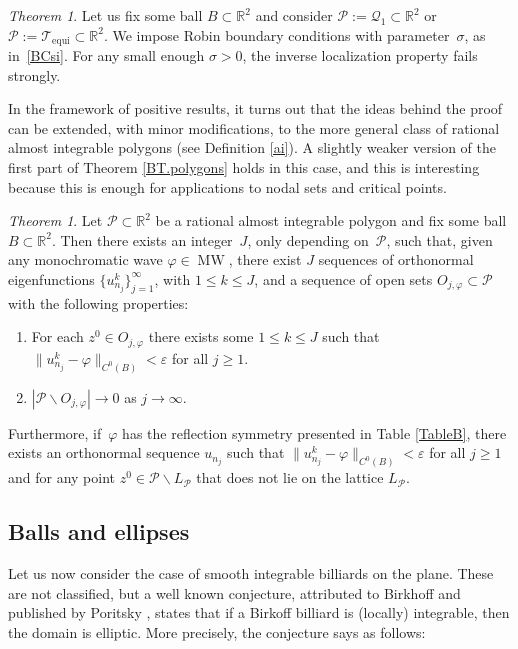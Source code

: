 \documentclass{amsart}
\theoremstyle{definition}
\theoremstyle{remark}
\newcommand{\ep}{\varepsilon}
\newcommand{\si}{\sigma}
\newcommand{\vp}{\varphi}
\def\RR{\mathbb{R}}
\renewcommand\leq\leqslant
\renewcommand\geq\geqslant
\numberwithin{equation}{section}
\newcounter{bigthm}
\newtheorem{bigtheorem}[bigthm]{Theorem} %
\theoremstyle{definition}
\theoremstyle{remark}
\def\RR{\mathbb{R}}
\DeclareMathOperator\MW{MW}
\begin{document}
\begin{bigtheorem}\label{T.noILrobin}
	Let us fix some ball $B\subset\RR^2$ and consider $\mathcal{P}:=\mathcal{Q}_1\subset\RR^2$ or $\mathcal{P}:=\mathcal{T}_{\mathrm{equi}}\subset\RR^2$. We impose  Robin boundary conditions with parameter~$\si$, as in~\eqref{BCsi}. For any small enough $\si>0$, the inverse localization property fails strongly.
\end{bigtheorem}



In the framework of positive results, it turns out that the ideas behind the proof can be extended, with minor modifications, to the more general class of rational almost integrable polygons (see Definition \ref{ai}). A slightly weaker version of the first part of Theorem \ref{BT.polygons} holds in this case, and this is interesting because this is enough for applications to nodal sets and critical points.

\begin{bigtheorem}\label{T.LATICE}
	Let $\mathcal P\subset\mathbb{R}^{2}$ be a rational almost integrable polygon and fix some ball $B\subset\RR^2$. Then there exists an integer~$J$, only depending on~$\mathcal P$, such that, given any monochromatic wave $\vp\in\MW$, there exist $J$ sequences of orthonormal eigenfunctions $\{u_{n_j}^k\}_{j=1}^\infty$, with $1\leq k\leq J$, and a sequence of open sets $O_{j,\vp}\subset\mathcal P$ with the following properties:
	\begin{enumerate}
		\item For each $z^0\in O_{j,\varphi}$ there exists some $1\leq k\leq J$ such that $\|u^k_{n_j}-\vp\|_{C^0(B)}<\ep$ for all $j\geq1$.
		\item $|\mathcal P\backslash O_{j,\vp}|\to0$ as $j\to\infty$.
	\end{enumerate}
	Furthermore, if~$\vp$ has the reflection symmetry presented in Table \eqref{TableB}, there exists an orthonormal sequence $u_{n_j}$ such that $\|u^k_{n_j}-\vp\|_{C^0(B)}<\ep$ for all $j\geq1$ and for any point $z^0 \in\mathcal P \backslash L_{\mathcal{P}}$ that does not lie on the lattice $L_{\mathcal P}$.
	\end{bigtheorem}
 


\subsection{Balls and ellipses}

Let us now consider the case of smooth integrable billiards on the plane. These are not classified, but a well known conjecture, attributed to Birkhoff \cite{Birkhoff} and published by Poritsky \cite{Poritsky}, states that if a Birkoff billiard is (locally) integrable, then the domain is elliptic. More precisely, the conjecture says as follows: 
\end{document}
